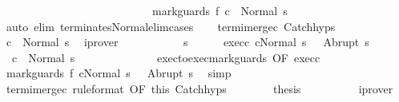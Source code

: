\begin{isabellebody}
\ \ \ \ \ \ \ \ \ \ \ \ \ \ \ \ \ \ \ \ \ \ \ \ \ \ \ {\isasymGamma}{\isasymturnstile}mark{\isacharunderscore}guards\ f\ c{}\ {\isasymdown}\ Normal\ s{\isacharprime}{\isachardoublequoteclose}\isanewline
\ \ \ \ \isamarkupfalse%
\ {\isacharparenleft}auto\ elim{\isacharcolon}\ terminates{\isacharunderscore}Normal{\isacharunderscore}elim{\isacharunderscore}cases{\isacharparenright}\isanewline
\ \ \isamarkupfalse%
\ termi{\isacharunderscore}merge{\isacharunderscore}c{}\ Catch{\isachardot}hyps\isanewline
\ \ \isamarkupfalse%
\ {\isachardoublequoteopen}{\isasymGamma}{\isasymturnstile}c{}\ {\isasymdown}\ Normal\ s{\isachardoublequoteclose}\ \isamarkupfalse%
\ iprover\isanewline
\ \ \isamarkupfalse%
\isanewline
\ \ \isacommand{{\isacharbraceleft}}\isamarkupfalse%
\isanewline
\ \ \ \ \isamarkupfalse%
\ s{\isacharprime}\isanewline
\ \ \ \ \isamarkupfalse%
\ exec{\isacharunderscore}c{}{\isacharcolon}\ {\isachardoublequoteopen}{\isasymGamma}{\isasymturnstile}{\isasymlangle}c{}{\isacharcomma}Normal\ s\ {\isasymrangle}\ {\isasymRightarrow}\ Abrupt\ s{\isacharprime}{\isachardoublequoteclose}\isanewline
\ \ \ \ \isamarkupfalse%
\ {\isachardoublequoteopen}{\isasymGamma}{\isasymturnstile}\ c{}\ {\isasymdown}\ Normal\ s{\isacharprime}{\isachardoublequoteclose}\isanewline
\ \ \ \ \isamarkupfalse%
\ {\isacharminus}\isanewline
\ \ \ \ \ \ \isamarkupfalse%
\ exec{\isacharunderscore}to{\isacharunderscore}exec{\isacharunderscore}mark{\isacharunderscore}guards\ {\isacharbrackleft}OF\ exec{\isacharunderscore}c{}{\isacharbrackright}\ \isanewline
\ \ \ \ \ \ \isamarkupfalse%
\ {\isachardoublequoteopen}{\isasymGamma}{\isasymturnstile}{\isasymlangle}mark{\isacharunderscore}guards\ f\ c{}{\isacharcomma}Normal\ s\ {\isasymrangle}\ {\isasymRightarrow}\ Abrupt\ s{\isacharprime}{\isachardoublequoteclose}\ \isamarkupfalse%
\ simp\isanewline
\ \ \ \ \ \ \isamarkupfalse%
\ termi{\isacharunderscore}merge{\isacharunderscore}c{}\ {\isacharbrackleft}rule{\isacharunderscore}format{\isacharcomma}\ OF\ this{\isacharbrackright}\ Catch{\isachardot}hyps\isanewline
\ \ \ \ \ \ \isamarkupfalse%
\ {\isacharquery}thesis\isanewline
\ \ \ \ \ \ \ \ \isamarkupfalse%
\ iprover\isanewline
\ \ \ \ \isamarkupfalse%
\isanewline
\ \ \isacommand{{\isacharbraceright}}\isamarkupfalse%

\end{isabellebody}
